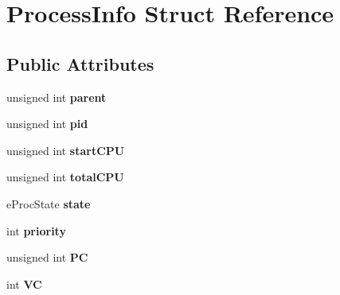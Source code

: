 \hypertarget{structProcessInfo}{\section{\-Process\-Info \-Struct \-Reference}
\label{dd/dc8/structProcessInfo}
}
\subsection*{\-Public \-Attributes}
\begin{DoxyCompactItemize}
\item 
\hypertarget{structProcessInfo_a102b9e7e7d958b508cec182bbcaf7d85}{unsigned int {\bfseries parent}}\label{dd/dc8/structProcessInfo_a102b9e7e7d958b508cec182bbcaf7d85}

\item 
\hypertarget{structProcessInfo_ab522cec1e6f7f3b6a7780e6b4611c1f4}{unsigned int {\bfseries pid}}\label{dd/dc8/structProcessInfo_ab522cec1e6f7f3b6a7780e6b4611c1f4}

\item 
\hypertarget{structProcessInfo_ac1e6244dd31274040bdf7ad7ee40db4a}{unsigned int {\bfseries start\-C\-P\-U}}\label{dd/dc8/structProcessInfo_ac1e6244dd31274040bdf7ad7ee40db4a}

\item 
\hypertarget{structProcessInfo_a8a6eda10132e07b1596c09822724b0c7}{unsigned int {\bfseries total\-C\-P\-U}}\label{dd/dc8/structProcessInfo_a8a6eda10132e07b1596c09822724b0c7}

\item 
\hypertarget{structProcessInfo_a748790bb8c3ef5d2dff552f35b81298e}{e\-Proc\-State {\bfseries state}}\label{dd/dc8/structProcessInfo_a748790bb8c3ef5d2dff552f35b81298e}

\item 
\hypertarget{structProcessInfo_a2f9f55dc3548d0bed66e06db8f47d958}{int {\bfseries priority}}\label{dd/dc8/structProcessInfo_a2f9f55dc3548d0bed66e06db8f47d958}

\item 
\hypertarget{structProcessInfo_a9b2d3f321f21ec1ee97c8dd5e63ac6c8}{unsigned int {\bfseries \-P\-C}}\label{dd/dc8/structProcessInfo_a9b2d3f321f21ec1ee97c8dd5e63ac6c8}

\item 
\hypertarget{structProcessInfo_ab288b59e794cb506663e22c680e05c2d}{int {\bfseries \-V\-C}}\label{dd/dc8/structProcessInfo_ab288b59e794cb506663e22c680e05c2d}


\end{DoxyCompactItemize}
